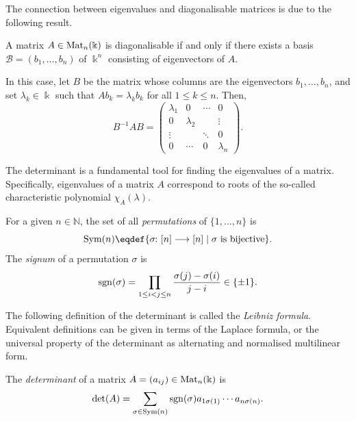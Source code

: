 \documentclass[a4paper, oneside, 12pt]{amsart}
\begin{document}
The connection between eigenvalues and diagonalisable matrices is due to the following result.

\begin{proposition}\label{prop:diag-iff-basis-of-eigenvalues}
  A matrix \( A \in \operatorname{Mat}_{n}(\Bbbk) \) is diagonalisable if and only if there exists a basis \( \mathcal{B} = (b_1, \dots, b_n) \) of \( \Bbbk^n \) consisting of eigenvectors of \( A \).

  In this case, let \( B \) be the matrix whose columns are the eigenvectors \( b_1, \dots, b_n \), and set \( \lambda_k \in \Bbbk \)  such that \(Ab_{k}=\lambda_{k}b_{k}\) for all \(1\le k \leq n\).
  Then,
  \begin{equation}
    B^{-1} A B =
    \begin{pmatrix}
      \lambda_1 & 0 & \cdots & 0 \\
      0 & \lambda_2 & & \vdots \\
      \vdots & & \ddots & 0 \\
      0 & \cdots & 0 & \lambda_n
    \end{pmatrix}.
  \end{equation}
\end{proposition}

The determinant is a fundamental tool for finding the eigenvalues of a matrix.
Specifically, eigenvalues of a matrix \(A\) correspond to roots of the so-called characteristic polynomial \(\chi_{A}(\lambda)\).

\begin{definition}\label{def:permutation}
  For a given \( n \in \mathbb{N} \), the set of all \emph{permutations} of \( \{1, \dots, n\} \) is
  \begin{equation}
    \Sym(n) \eqdef \{\sigma \from [n] \to [n] \mid \sigma \text{ is bijective}\}.
  \end{equation}
  The \emph{signum} of a permutation \( \sigma \) is
  \begin{equation}
    \operatorname{sgn}(\sigma) = \prod_{1\leq i<j \leq n}\frac{\sigma(j)-\sigma(i)}{j-i} \in \{\pm 1\}.
  \end{equation}
\end{definition}

The following definition of the determinant is called the \emph{ Leibniz formula}.
Equivalent definitions can be given in terms of the Laplace formula, or the universal property of the determinant as alternating and normalised multilinear form.
\begin{definition}\label{def:determinant}
  The \emph{determinant} of a matrix \( A = (a_{ij}) \in \operatorname{Mat}_n(\Bbbk) \) is
  \begin{equation}
    \det(A) = \sum_{\sigma \in \operatorname{Sym}(n)} \operatorname{sgn}(\sigma) a_{1\sigma(1)} \cdots a_{n\sigma(n)}.
  \end{equation}
\end{definition}
\end{document}

